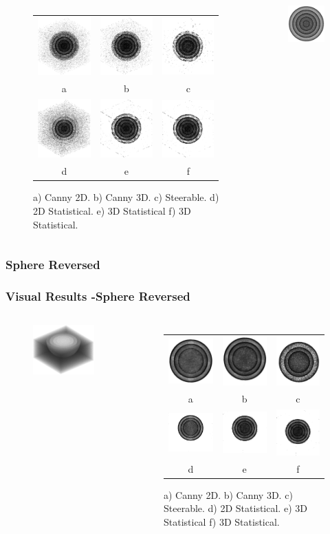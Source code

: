 \documentclass[9pt]{beamer}
\begin{document}
\begin{frame}
\begin{columns}
\begin{figure}
\begin{tabular}{c c c }
\includegraphics[scale=0.18]{canny2dsphere.eps}&\includegraphics[scale=0.18]{Cannysigma3sphere}&\includegraphics[scale=0.18]{SteerableFilterSigma2sphere}\\
a & b & c \\
\includegraphics[scale=0.18]{stat2dsphere.eps}& \includegraphics[scale=0.18]{T3_sphere}&\includegraphics[scale=0.18]{T13_sphere}\\

d & e & f\\

\end{tabular}
\caption{ a) Canny 2D. b) Canny 3D. c) Steerable. d) 2D Statistical. e) 3D Statistical  f) 3D Statistical.}
\end{figure}
\vspace{-2cm}
\begin{figure}
\includegraphics[width=1\textwidth]{sphereideal.eps}
\end{figure}
\end{columns}
\end{frame}
\subsubsection{Sphere Reversed}
\begin{frame}

\frametitle{Visual Results -Sphere Reversed}
\begin{columns}
\vspace{-2cm}
\begin{figure}
\includegraphics[width=1\textwidth]{sphere_reversed.eps}
\end{figure}
\begin{figure}
\begin{tabular}{c c c }
\includegraphics[scale=0.18]{canny2dsphereR.eps}&\includegraphics[scale=0.18]{Cannysigma3sphereR}&\includegraphics[scale=0.18]{SteerableFilterSigma2sphereR}\\
a & b & c\\
\includegraphics[scale=0.18]{stat2dsphereR.eps} & \includegraphics[scale=0.18]{T3_sphereR}&\includegraphics[scale=0.18]{T13_sphereR}\\

d & e & f\\
\end{tabular}
\caption{ a) Canny 2D. b) Canny 3D. c) Steerable. d) 2D Statistical. e) 3D Statistical  f) 3D Statistical.}
\end{figure}
\end{columns}
\end{frame}
\end{document}
